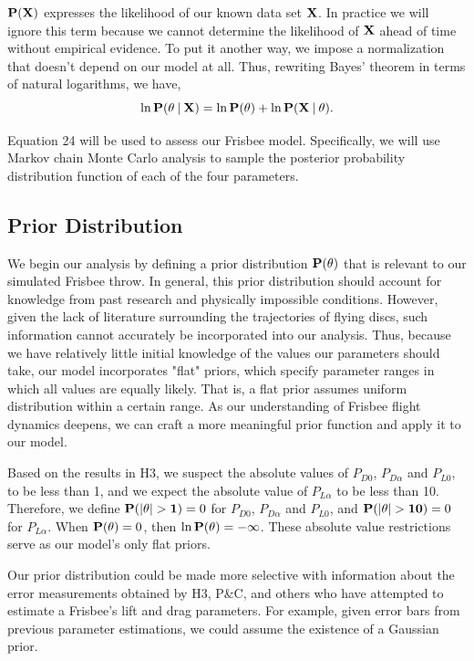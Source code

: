 \documentclass[a4paper,12pt, oneside]{article}
\newcommand\givenbase[1][]{\:#1\lvert\:}
\let\given\givenbase
\begin{document}
$\bold{P(\bold{X})}$ expresses the likelihood of our known data set $\bold{X}$. In practice we will ignore this term because we cannot determine the likelihood of $\bold{X}$ ahead of time without empirical evidence. To put it another way, we impose a normalization that doesn't depend on our model at all. Thus, rewriting Bayes' theorem in terms of natural logarithms, we have,
\begin{equation}
\ln\bold{P}(\theta\given\bold{X})=\ln{\bold{P(\theta})+\ln\bold{P({X}\given\theta})}.
\end{equation}

Equation 24 will be used to assess our Frisbee model.  Specifically, we will use Markov chain Monte Carlo analysis to sample the posterior probability distribution function of each of the four parameters. 


\subsection{Prior Distribution}
We begin our analysis by defining a prior distribution $\bold{P(\theta)}$ that is relevant to our simulated Frisbee throw. In general, this prior distribution should account for knowledge from past research and physically impossible conditions. However, given the lack of literature surrounding the trajectories of flying discs, such information cannot accurately be incorporated into our analysis.  Thus, because we have relatively little initial knowledge of the values our parameters should take, our model incorporates "flat" priors, which specify parameter ranges in which all values are equally likely. That is, a flat prior assumes uniform distribution within a certain range. As our understanding of Frisbee flight dynamics deepens, we can craft a more meaningful prior function and apply it to our model. 

Based on the results in H3, we suspect the absolute values of $P_{D0}$, $P_{D\alpha}$ and $P_{L0}$, to be less than 1, and we expect the absolute value of $P_{L\alpha}$ to be less than 10. Therefore, we define $\bold{P(\left|\theta\right|>1)}=0$ for $P_{D0}$, $P_{D\alpha}$ and $P_{L0}$, and $\bold{P(\left|\theta\right|>10)}=0$ for $P_{L\alpha}$. When  $\bold{P(\theta)}=0$, then $\ln\bold{P(\theta)}=-\infty$. These absolute value restrictions serve as our model's only flat priors.

Our prior distribution could be made more selective with information about the error measurements obtained by H3, P\&C, and others who have attempted to estimate a Frisbee's lift and drag parameters. For example, given error bars from previous parameter estimations, we could assume the existence of a Gaussian prior. 
\end{document}
